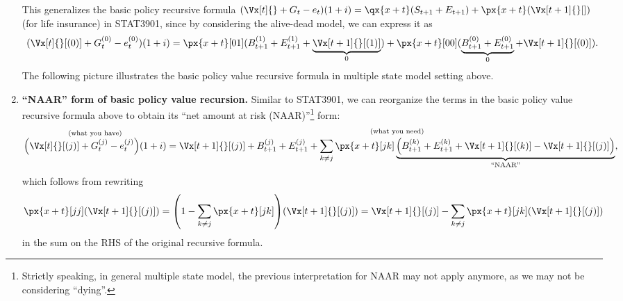 \begin{enumerate}
This generalizes the basic policy recursive formula \((\Vx[t]{}+G_t-e_t)(1+i)=
\qx{x+t}(S_{t+1}+E_{t+1})+\px{x+t}(\Vx[t+1]{}[])\) (for life insurance)  in
STAT3901, since by considering the alive-dead model, we can express it as
\[
(\Vx[t]{}[(0)]+G_t^{(0)}-e_t^{(0)})(1+i)=\px{x+t}[01](B_{t+1}^{(1)}+E_{t+1}^{(1)}+\underbrace{\Vx[t+1]{}[(1)]}_{0})
+\px{x+t}[00](\underbrace{B_{t+1}^{(0)}+E_{t+1}^{(0)}}_{0}+\Vx[t+1]{}[(0)]).
\]
The following picture illustrates the basic policy value recursive formula in
multiple state model setting above.
\begin{center}
\end{center}

\item \textbf{``NAAR'' form of basic policy value recursion.} Similar to
STAT3901, we can reorganize the terms in the basic policy value recursive
formula above to obtain its ``net amount at risk (NAAR)''\footnote{Strictly
speaking, in general multiple state model, the previous interpretation for NAAR
may not apply anymore, as we may not be considering ``dying''.} form:
\[
\overset{\text{(what you have)}}{\qty(\Vx[t]{}[(j)]+G_t^{(j)}-e_t^{(j)})(1+i)}
=\overset{\text{(what you need)}}{\Vx[t+1]{}[(j)]+B_{t+1}^{(j)}+E_{t+1}^{(j)}+
\sum_{k\ne j}^{}\px{x+t}[jk]
\underbrace{\qty(B_{t+1}^{(k)}+E_{t+1}^{(k)}+\Vx[t+1]{}[(k)]-\Vx[t+1]{}[(j)])}_{\text{``NAAR''}}},
\]
which follows from rewriting
\[
\px{x+t}[jj]\qty(\Vx[t+1]{}[(j)])
=\qty(1-\sum_{k\ne j}^{}\px{x+t}[jk])\qty(\Vx[t+1]{}[(j)])
=\Vx[t+1]{}[(j)]-\sum_{k\ne j}^{}\px{x+t}[jk]\qty(\Vx[t+1]{}[(j)])
\]
in the sum on the RHS of the original recursive formula.


\end{enumerate}
